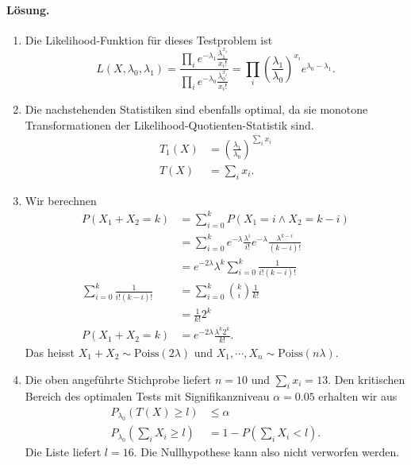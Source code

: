 \paragraph*{Lösung.}
\begin{enumerate}
    
    \item Die Likelihood-Funktion für dieses Testproblem ist 
        \begin{equation*}
            L(X, \lambda_0, \lambda_1) = \frac{\prod_i e^{-\lambda_1} \frac{\lambda_1^{x_i}}{x_i!}}
            {\prod_i e^{-\lambda_0} \frac{\lambda_0^{x_i}}{x_i!}} =
            \prod_i \left(  \frac{\lambda_1}{\lambda_0} \right)^{x_i} e^{\lambda_0 - \lambda_1}.
        \end{equation*}

    \item Die nachstehenden Statistiken sind ebenfalls optimal, da sie monotone Transformationen der
        Likelihood-Quotienten-Statistik sind.
        \begin{align*}
            T_1(X) &= \left( \frac{\lambda_1}{\lambda_0} \right)^{\sum_{i}^{} x_i} \\
            T (X) &= \sum_{i}^{} x_i.
        \end{align*}
    
    \item Wir berechnen
        \begin{align*}
            P \left( X_1+X_2 = k \right) &= \sum_{i=0}^{k} P \left( X_1=i \wedge X_2 = k-i \right) \\
            &= \sum_{i=0}^{k} e^{-\lambda} \frac{\lambda^i}{i!} e^{-\lambda} \frac{\lambda^{k-i}}{(k-i)!} \\
            &= e^{-2\lambda} \lambda^k \sum_{i=0}^{k} \frac{1}{i! (k-i)!} \\
            \sum_{i=0}^{k} \frac{1}{i! (k-i)!} &= \sum_{i=0}^{k} \binom{k}{i} \frac{1}{k!} \\
            &= \frac{1}{k!} 2^k \\
            P \left( X_1+X_2 = k \right) &= e^{-2\lambda} \frac{ \lambda^k 2^k   }{k!}. 
        \end{align*}
        Das heisst $X_1+X_2\sim\text{Poiss}(2\lambda)$ und $X_1, \cdots, X_n
        \sim \text{Poiss}(n\lambda)$.

    \item Die oben angeführte Stichprobe liefert $n=10$ und $\sum_{i}^{} x_i =
        13$. Den kritischen Bereich des optimalen Tests mit Signifikanzniveau
        $\alpha=0.05$ erhalten wir aus
        \begin{align*}
            P_{\lambda_0} \left( T(X) \geq l \right) & \leq \alpha \\
            P_{\lambda_0} \left( \sum_{i}^{} X_i \geq l \right) 
            &= 1 - P\left( \sum_{i}^{} X_i < l \right).
        \end{align*}
        Die Liste liefert $l=16$. Die Nullhypothese kann also nicht verworfen werden.

\end{enumerate}




